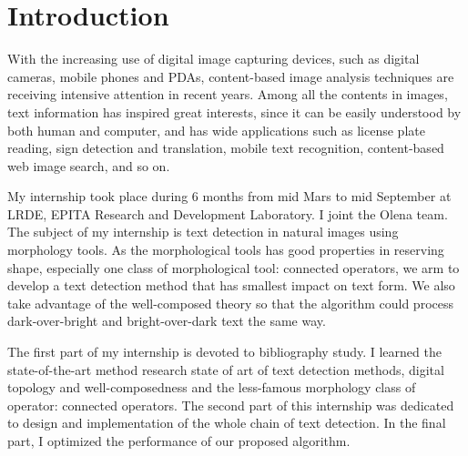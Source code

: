 
\graphicspath{ {1chapterIntroduction/image/} }
\chapter{Introduction}

With the increasing use of digital image capturing devices, such as digital cameras, mobile phones and PDAs, content-based image analysis techniques are receiving intensive attention in recent years. Among all the contents in images, text information has inspired great interests, since it can be easily understood by both human and computer, and has wide applications such as license plate reading, sign detection and translation, mobile text recognition, content-based web image search, and so on.


My internship took place during 6 months from mid Mars to mid September at LRDE, EPITA Research and Development Laboratory. I joint the Olena team. The subject of my internship is text detection in natural images using morphology tools. As the morphological tools has good properties in reserving shape, especially one class of morphological tool: connected operators, we arm to develop a text detection method that has smallest impact on text form. We also take advantage of the well-composed theory so that the algorithm could process dark-over-bright and bright-over-dark text the same way.


The first part of my internship is devoted to bibliography study. I learned the state-of-the-art method research state of art of text detection methods, digital topology and well-composedness and the less-famous morphology class of operator: connected operators. The second part of this internship was dedicated to design and implementation of the whole chain of text detection. In the final part, I optimized the performance of our proposed algorithm.